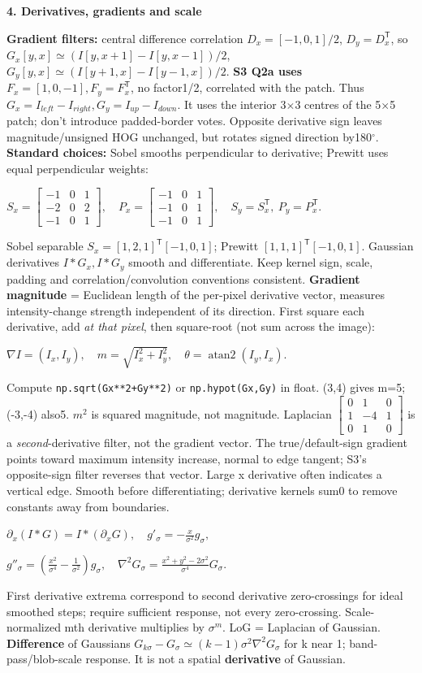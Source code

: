 \documentclass[a4paper]{article}
\newcommand{\key}[1]{\textbf{#1}}
\newcommand{\Topic}[1]{\par\vspace{1.7pt}\noindent
  {\fontsize{7.7}{8.0}\selectfont\bfseries #1}\par\vspace{0.3pt}}
\newcommand{\eq}[1]{\par\noindent\mbox{\(\displaystyle #1\)}\par}
\newcommand{\smat}[1]{\left[\begin{smallmatrix}#1\end{smallmatrix}\right]}
\newcommand{\trans}{^{\mathsf T}}
\newcounter{sheet}
\newcounter{sheetcolumn}
\newlength{\colwidth}
\newenvironment{sheetcol}[1][7.0]{\stepcounter{sheetcolumn}
  \begin{lrbox}{\columnbox}\begin{minipage}[t]{\colwidth}\vspace{0pt}
  \fontsize{#1}{\dimexpr#1pt+0.6pt\relax}\selectfont}
  {\end{minipage}\end{lrbox}
  \typeout{CV1COL|\thesheet|\thesheetcolumn|\the\dimexpr\ht\columnbox+\dp\columnbox\relax}
  \usebox{\columnbox}\ignorespacesafterend}
\begin{document}
\begin{sheetcol}[6.54]
\Topic{4. Derivatives, gradients and scale}
\key{Gradient filters:} central difference correlation \(D_x=[-1,0,1]/2\), \(D_y=D_x\trans\), so \(G_x[y,x]\simeq(I[y,x+1]-I[y,x-1])/2\), \(G_y[y,x]\simeq(I[y+1,x]-I[y-1,x])/2\).
\key{S3 Q2a uses} \(F_x=[1,0,-1],F_y=F_x\trans\), no factor1/2, correlated with the patch. Thus \(G_x=I_{left}-I_{right},G_y=I_{up}-I_{down}\). It uses the interior 3\(\times\)3 centres of the 5\(\times\)5 patch; don't introduce padded-border votes. Opposite derivative sign leaves magnitude/unsigned HOG unchanged, but rotates signed direction by180\(^{\circ}\).
\key{Standard choices:} Sobel smooths perpendicular to derivative; Prewitt uses equal perpendicular weights:
\eq{S_x=\smat{-1&0&1\\-2&0&2\\-1&0&1},\quad
P_x=\smat{-1&0&1\\-1&0&1\\-1&0&1},\quad S_y=S_x\trans,\ P_y=P_x\trans.}
Sobel separable \(S_x=[1,2,1]\trans[-1,0,1]\); Prewitt \([1,1,1]\trans[-1,0,1]\). Gaussian derivatives \(I*G_x,I*G_y\) smooth and differentiate. Keep kernel sign, scale, padding and correlation/convolution conventions consistent.
\key{Gradient magnitude} = Euclidean length of the per-pixel derivative vector, measures intensity-change strength independent of its direction. First square each derivative, add \emph{at that pixel}, then square-root (not sum across the image):
\eq{\nabla I=(I_x,I_y),\quad m=\sqrt{I_x^2+I_y^2},\quad
 \theta=\operatorname{atan2}(I_y,I_x).}
Compute \texttt{np.sqrt(Gx**2+Gy**2)} or \texttt{np.hypot(Gx,Gy)} in float. (3,4) gives m=5; (-3,-4) also5. \(m^2\) is squared magnitude, not magnitude. Laplacian \(\smat{0&1&0\\1&-4&1\\0&1&0}\) is a \emph{second}-derivative filter, not the gradient vector.
The true/default-sign gradient points toward maximum intensity increase, normal to edge tangent; S3's opposite-sign filter reverses that vector. Large x derivative often indicates a vertical edge. Smooth before differentiating; derivative kernels sum0 to remove constants away from boundaries.
\eq{\partial_x(I*G)=I*(\partial_xG),\quad
 g'_\sigma=-\frac{x}{\sigma^2}g_\sigma,}
\eq{g''_\sigma=\left(\frac{x^2}{\sigma^4}-\frac1{\sigma^2}\right)g_\sigma,\quad
 \nabla^2G_\sigma=\frac{x^2+y^2-2\sigma^2}{\sigma^4}G_\sigma.}
First derivative extrema correspond to second derivative zero-crossings for ideal smoothed steps; require sufficient response, not every zero-crossing. Scale-normalized mth derivative multiplies by \(\sigma^m\). LoG = Laplacian of Gaussian. \key{Difference} of Gaussians \(G_{k\sigma}-G_\sigma\simeq(k-1)\sigma^2\nabla^2G_\sigma\) for k near 1; band-pass/blob-scale response. It is not a spatial \key{derivative} of Gaussian.


\end{sheetcol}
\end{document}

